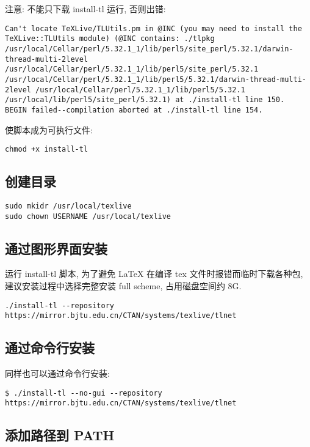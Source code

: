 注意: 不能只下载 install-tl 运行, 否则出错:
\begin{verbatim}
Can't locate TeXLive/TLUtils.pm in @INC (you may need to install the TeXLive::TLUtils module) (@INC contains: ./tlpkg /usr/local/Cellar/perl/5.32.1_1/lib/perl5/site_perl/5.32.1/darwin-thread-multi-2level /usr/local/Cellar/perl/5.32.1_1/lib/perl5/site_perl/5.32.1 /usr/local/Cellar/perl/5.32.1_1/lib/perl5/5.32.1/darwin-thread-multi-2level /usr/local/Cellar/perl/5.32.1_1/lib/perl5/5.32.1 /usr/local/lib/perl5/site_perl/5.32.1) at ./install-tl line 150.
BEGIN failed--compilation aborted at ./install-tl line 154.
\end{verbatim}

使脚本成为可执行文件:

\begin{verbatim}
chmod +x install-tl
\end{verbatim}

\subsection{创建目录}

\begin{verbatim}
sudo mkidr /usr/local/texlive
sudo chown USERNAME /usr/local/texlive
\end{verbatim}

\subsection{通过图形界面安装}

运行 install-tl 脚本, 为了避免 {\LaTeX} 在编译 tex 文件时报错而临时下载各种包, 
建议安装过程中选择完整安装 full scheme, 占用磁盘空间约 8G.

\begin{verbatim}
./install-tl --repository https://mirror.bjtu.edu.cn/CTAN/systems/texlive/tlnet
\end{verbatim}

\subsection{通过命令行安装 }

同样也可以通过命令行安装:

\begin{verbatim}
$ ./install-tl --no-gui --repository https://mirror.bjtu.edu.cn/CTAN/systems/texlive/tlnet
\end{verbatim}

\subsection{添加路径到 PATH}


